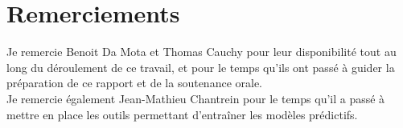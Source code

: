 \thispagestyle{empty}
\chapter*{Remerciements}

\vspace{0.5cm}

\begin{changemargin}{3.2cm}{5cm}

Je remercie Benoit Da Mota et Thomas Cauchy pour leur disponibilité tout au long du déroulement de ce travail, et pour le temps qu'ils ont passé à guider la préparation de ce rapport et de la soutenance orale.\\
\noindent Je remercie également Jean-Mathieu Chantrein pour le temps qu'il a passé à mettre en place les outils permettant d'entraîner les modèles prédictifs.



\end{changemargin}